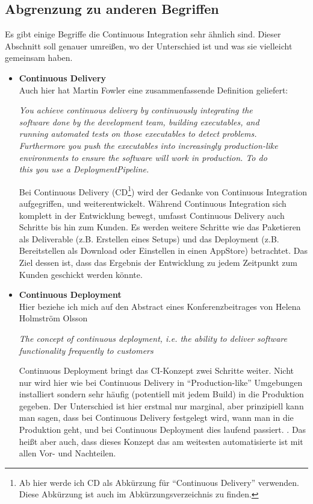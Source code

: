 \subsection{Abgrenzung zu anderen Begriffen}
Es gibt einige Begriffe die Continuous Integration sehr ähnlich sind. Dieser Abschnitt soll genauer umreißen, wo der Unterschied ist und was sie vielleicht gemeinsam haben.
\begin{itemize}
	\item\textbf{Continuous Delivery}\\
	Auch hier hat Martin Fowler eine zusammenfassende Definition geliefert:
\begin{center}
	\textit{
	You achieve continuous delivery by continuously integrating the \\software done by the development team, building executables, and\\ running automated tests on those executables to detect problems. \\Furthermore you push the executables into increasingly production-like \\environments to ensure the software will work in production. To do \\this you use a DeploymentPipeline.}\\ \cite{fowler-CD}
\end{center}
	Bei Continuous Delivery (CD\footnote{Ab hier werde ich CD als Abkürzung für "`Continuous Delivery"' verwenden. Diese Abkürzung ist auch im Abkürzungsverzeichnis zu finden.}) wird der Gedanke von Continuous Integration aufgegriffen, und weiterentwickelt. Während Continuous Integration sich komplett in der Entwicklung bewegt, umfasst Continuous Delivery auch Schritte bis hin zum Kunden. Es werden weitere Schritte wie das Paketieren als Deliverable (z.B. Erstellen eines Setups) und das Deployment (z.B. Bereitstellen als Download oder Einstellen in einen AppStore) betrachtet. Das Ziel dessen ist, dass das Ergebnis der Entwicklung zu jedem Zeitpunkt zum Kunden geschickt werden könnte.\\
	\item\textbf{Continuous Deployment}\\
	Hier beziehe ich mich auf den Abstract eines Konferenzbeitrages von Helena Holmström Olsson
	\begin{center}
		\textit{
		The concept of continuous deployment, i.e. the ability to deliver software functionality frequently to customers \textelp{}}\\
		\cite{olsson2012climbing}
	\end{center}
	Continuous Deployment bringt das CI-Konzept zwei Schritte weiter. Nicht nur wird hier wie bei Continuous Delivery in "`Production-like"' Umgebungen installiert sondern sehr häufig (potentiell mit jedem Build) in die Produktion gegeben. Der Unterschied ist hier erstmal nur marginal, aber prinzipiell kann man sagen, dass bei Continuous Delivery festgelegt wird, wann man in die Produktion geht, und bei Continuous Deployment dies laufend passiert. \cite{scrum-overview-ci-cd}. Das heißt aber auch, dass dieses Konzept das am weitesten automatisierte ist mit allen Vor- und Nachteilen.
	

\end{itemize}
